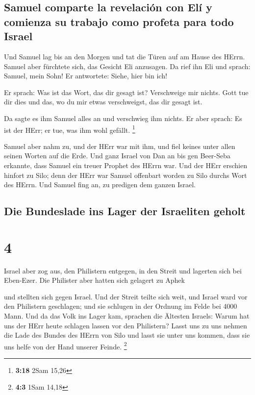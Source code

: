 \hypertarget{samuel-comparte-la-revelaciuxf3n-con-eluxed-y-comienza-su-trabajo-como-profeta-para-todo-israel}{%
\subsection{Samuel comparte la revelación con Elí y comienza su trabajo
como profeta para todo
Israel}\label{samuel-comparte-la-revelaciuxf3n-con-eluxed-y-comienza-su-trabajo-como-profeta-para-todo-israel}}

 Und Samuel lag bis an den Morgen und tat die Türen auf
am Hause des HErrn. Samuel aber fürchtete sich, das Gesicht Eli
anzusagen.  Da rief ihn Eli und sprach: Samuel, mein
Sohn! Er antwortete: Siehe, hier bin ich!

 Er sprach: Was ist das Wort, das dir gesagt ist?
Verschweige mir nichts. Gott tue dir dies und das, wo du mir etwas
verschweigst, das dir gesagt ist.

 Da sagte es ihm Samuel alles an und verschwieg ihm
nichts. Er aber sprach: Es ist der HErr; er tue, was ihm wohl gefällt.
\footnote{\textbf{3:18} 2Sam 15,26}

 Samuel aber nahm zu, und der HErr war mit ihm, und fiel
keines unter allen seinen Worten auf die Erde.  Und ganz
Israel von Dan an bis gen Beer-Seba erkannte, dass Samuel ein treuer
Prophet des HErrn war.  Und der HErr erschien hinfort zu
Silo; denn der HErr war Samuel offenbart worden zu Silo durchs Wort des
HErrn. Und Samuel fing an, zu predigen dem ganzen Israel.

\hypertarget{die-bundeslade-ins-lager-der-israeliten-geholt}{%
\subsection{Die Bundeslade ins Lager der Israeliten
geholt}\label{die-bundeslade-ins-lager-der-israeliten-geholt}}

\hypertarget{section-3}{%
\section{4}\label{section-3}}

 Israel aber zog aus, den Philistern entgegen, in den
Streit und lagerten sich bei Eben-Ezer. Die Philister aber hatten sich
gelagert zu Aphek

 und stellten sich gegen Israel. Und der Streit teilte
sich weit, und Israel ward vor den Philistern geschlagen; und sie
schlugen in der Ordnung im Felde bei 4000 Mann.  Und da
das Volk ins Lager kam, sprachen die Ältesten Israels: Warum hat uns der
HErr heute schlagen lassen vor den Philistern? Lasst uns zu uns nehmen
die Lade des Bundes des HErrn von Silo und lasst sie unter uns kommen,
dass sie uns helfe von der Hand unserer Feinde. \footnote{\textbf{4:3}
  1Sam 14,18}

